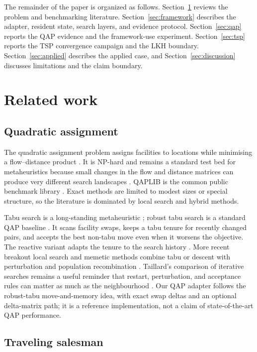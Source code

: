 \documentclass[pdflatex,sn-mathphys-num]{sn-jnl}
\begin{document}
The remainder of the paper is organized as follows. Section~\ref{sec:related} reviews the problem and
benchmarking literature. Section~\ref{sec:framework} describes the adapter, resident state, search
layers, and evidence protocol. Section~\ref{sec:qap} reports the QAP evidence and the framework-use
experiment. Section~\ref{sec:tsp} reports the TSP convergence campaign and the LKH boundary.
Section~\ref{sec:applied} describes the applied case, and Section~\ref{sec:discussion} discusses
limitations and the claim boundary.

\section{Related work}
\label{sec:related}

\subsection{Quadratic assignment}

The quadratic assignment problem assigns facilities to locations while minimising a flow--distance
product \citep{koopmans1957}. It is NP-hard \citep{sahni1976,garey1979} and remains a standard test bed for
metaheuristics because small changes in the flow and distance matrices can produce very different
search landscapes \citep{loiola2007}. QAPLIB is the common public benchmark library
\citep{burkard1997}. Exact methods are limited to modest sizes or special structure, so the literature
is dominated by local search and hybrid methods.

Tabu search is a long-standing metaheuristic \citep{glover1989}; robust tabu search is a standard QAP baseline \citep{taillard1991}. It scans facility swaps, keeps a
tabu tenure for recently changed pairs, and accepts the best non-tabu move even when it worsens the
objective. The reactive variant adapts the tenure to the search history \citep{battiti1994}. More
recent breakout local search and memetic methods combine tabu or descent with perturbation and
population recombination \citep{benlic2013}. Taillard's comparison of iterative searches remains a
useful reminder that restart, perturbation, and acceptance rules can matter as much as the
neighbourhood \citep{taillard1995}. Our QAP adapter follows the robust-tabu move-and-memory idea, with
exact swap deltas and an optional delta-matrix path; it is a reference implementation, not a claim of
state-of-the-art QAP performance.

\subsection{Traveling salesman}
\end{document}
